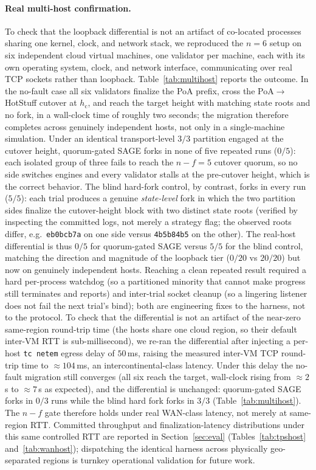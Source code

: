 \documentclass[journal]{IEEEtran}
\theoremstyle{definition}
\theoremstyle{remark}
\begin{document}
\paragraph{Real multi-host confirmation.}
To check that the loopback differential is not an artifact of co-located processes sharing
one kernel, clock, and network stack, we reproduced the $n{=}6$ setup on six independent
cloud virtual machines, one validator per machine, each with its own operating system,
clock, and network interface, communicating over real TCP sockets rather than loopback.
Table~\ref{tab:multihost} reports the outcome. In the no-fault case all six validators
finalize the PoA prefix, cross the PoA$\rightarrow$HotStuff cutover at $h_{\mathrm{c}}$, and
reach the target height with matching state roots and no fork, in a wall-clock time of
roughly two seconds; the migration therefore completes across genuinely independent hosts,
not only in a single-machine simulation. Under an identical transport-level $3/3$ partition
engaged at the cutover height, quorum-gated SAGE forks in none of five repeated runs
($0/5$): each isolated group of three fails to reach the $n{-}f{=}5$ cutover quorum, so no
side switches engines and every validator stalls at the pre-cutover height, which is the
correct behavior. The blind hard-fork control, by contrast, forks in every run ($5/5$):
each trial produces a genuine \emph{state-level} fork in which the two partition sides
finalize the cutover-height block with two distinct state roots (verified by inspecting the
committed logs, not merely a strategy flag; the observed roots differ, e.g.\ \texttt{eb0bcb7a}
on one side versus \texttt{4b5b84b5} on the other). The real-host differential is thus
$0/5$ for quorum-gated SAGE versus $5/5$ for the blind control, matching the direction and
magnitude of the loopback tier ($0/20$ vs $20/20$) but now on genuinely independent hosts.
Reaching a clean repeated result required a hard per-process watchdog (so a partitioned
minority that cannot make progress still terminates and reports) and inter-trial socket
cleanup (so a lingering listener does not fail the next trial's bind); both are engineering
fixes to the harness, not to the protocol. To check that the differential is not an artifact
of the near-zero same-region round-trip time (the hosts share one cloud region, so their
default inter-VM RTT is sub-millisecond), we re-ran the differential after injecting a
per-host \texttt{tc netem} egress delay of $50\,$ms, raising the measured inter-VM TCP
round-trip time to $\approx 104\,$ms, an intercontinental-class latency. Under this delay the
no-fault migration still converges (all six reach the target, wall-clock rising from
$\approx 2\,$s to $\approx 7\,$s as expected), and the differential is unchanged: quorum-gated
SAGE forks in $0/3$ runs while the blind hard fork forks in $3/3$ (Table~\ref{tab:multihost}).
The $n{-}f$ gate therefore holds under real WAN-class latency, not merely at same-region RTT.
Committed throughput and finalization-latency distributions under this same controlled RTT are
reported in Section~\ref{sec:eval} (Tables~\ref{tab:tpshost} and~\ref{tab:wanhost}); dispatching
the identical harness across physically geo-separated regions is turnkey operational validation
for future work.
\end{document}
